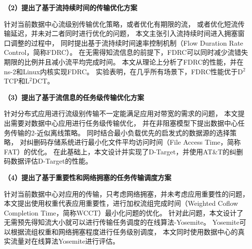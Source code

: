 \textbf{（2）提出了基于流持续时间的传输优化方案}

针对当前数据中心流级别传输优化策略，或者优化有期限的流，
或者优化短流传输延迟，并未对二者同时进行优化的问题，
本文主张引入流持续时间进入拥塞窗口调整的过程中，
同时提出基于流持续时间速率控制机制（Flow Duration Rate Control，简称FDRC）。
在无需得知流信息的前提下，FDRC可以同时减少流错失期限的比例并且减小流平均完成时间。
本文从理论上分析了FDRC的性能，并在ns-2和Linux内核实现FDRC。
实验表明，在几乎所有场景下，FDRC性能优于D$^2$TCP和L$^2$DCT。



\textbf{（3）提出了基于流信息的任务级传输优化方案}

针对分布式应用进行流级别传输不一定能满足应用对带宽的需求的问题，
本文提出需要对数据中心应用进行任务级传输优化，
并在非阻塞模型下提出数据中心任务传输的2-近似离线策略。
同时结合最小负载优先的启发式的数据源的选择策略，
对纠删码存储系统进行最小化文件平均访问时间（File Access Time，简称FAT）的优化。
在此基础上，本文设计并实现了D-Target，并使用AT\&T的纠删码数据评估D-Target的性能。

\textbf{（4）提出了基于重要性和网络拥塞的任务传输调度方案}

针对当前数据中心对应用的传输，只考虑网络拥塞，并未考虑应用重要性的问题，
本文提出使用权重代表应用重要性，进行加权流组完成时间（Weighted Coflow Completion Time，简称WCCT）最小化问题的优化。
针对此问题，本文设计了无需预先得知流大小就可以进行传输任务调度的在线算法-Yosemite。
Yosemite可以根据流组权重和网络拥塞程度进行任务级别调度，
本文同时使用数据中心的真实流量对在线算法Yosemite进行评估。


